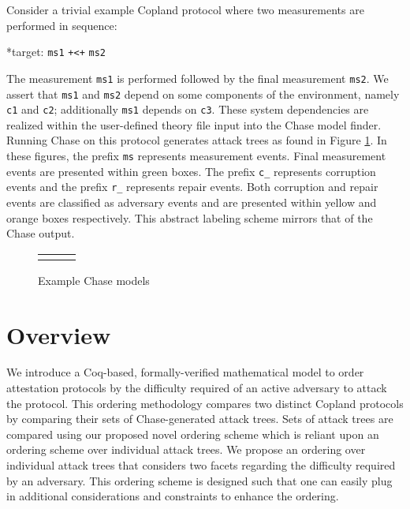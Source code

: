 \documentclass[runningheads]{llncs}
\theoremstyle{definition}
\begin{document}
Consider a trivial example Copland protocol where two measurements are
performed in sequence:

\begin{center}
    *target: \texttt{ms1} \texttt{+<+} \texttt{ms2}
\end{center}

\noindent The measurement \texttt{ms1} is performed followed by the
final measurement \texttt{ms2}. We assert that \texttt{ms1} and
\texttt{ms2} depend on some components of the environment, namely
\texttt{c1} and \texttt{c2}; additionally \texttt{ms1} depends on
\texttt{c3}. These system dependencies are realized within the
user-defined theory file input into the Chase model finder. Running
Chase on this protocol generates attack trees as found in Figure
\ref{fig:chase-ex}. In these figures, the prefix \texttt{ms}
represents measurement events. Final measurement events are presented
within green boxes. The prefix \texttt{c\_} represents corruption
events and the prefix \texttt{r\_} represents repair events. Both
corruption and repair events are classified as adversary events and
are presented within yellow and orange boxes respectively. This
abstract labeling scheme mirrors that of the Chase output.

\begin{figure}[hbtp]
    \centering 
    \begin{tabular}{m{3cm} m{3cm} m{3cm}}
         &  &  
    \end{tabular}
    \caption[Example Chase Models]{Example Chase models}
    \label{fig:chase-ex}
\end{figure}




\section{Overview}
We introduce a Coq-based, formally-verified mathematical model to order attestation protocols by the difficulty required of an active adversary to attack the protocol. This ordering methodology compares two distinct Copland protocols by comparing their sets of Chase-generated attack trees. Sets of attack trees are compared using our proposed novel ordering scheme which is reliant upon an ordering scheme over individual attack trees. We propose an ordering over individual attack trees that considers two facets regarding the difficulty required by an adversary. This ordering scheme is designed such that one can easily plug in additional considerations and constraints to enhance the ordering.
\end{document}
